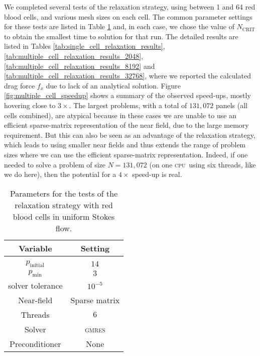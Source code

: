 \documentclass[smallcondensed,final]{svjour3}
\newcommand{\cpu}{\textsc{cpu}}
\newcommand{\ncrit}{N_{\text{CRIT}}}
\newcommand{\gmres}{\textsc{gmres}\xspace}
\begin{document}
We completed several tests of the relaxation strategy, using between 1 and 64 red blood cells, and various mesh sizes on each cell. The common parameter settings for these tests are listed in Table \ref{tab:cells_relaxation_settings} and, in each case, we chose the value of $\ncrit$ to obtain the smallest time to solution for that run. The detailed results are listed in Tables \ref{tab:single_cell_relaxation_results}, \ref{tab:multiple_cell_relaxation_results_2048}, \ref{tab:multiple_cell_relaxation_results_8192} and \ref{tab:multiple_cell_relaxation_results_32768}, where we reported the calculated drag force $f_x$ due to lack of an analytical solution. Figure \ref{fig:multiple_cell_speedup} shows a summary of the observed speed-ups, mostly hovering close to $3\times$. The largest problems, with a total of $131,072$ panels (all cells combined), are atypical because in these cases we are unable to use an efficient sparse-matrix representation of the near field, due to the large memory requirement. But this can also be seen as an advantage of the relaxation strategy, which leads to using smaller near fields and thus extends the range of problem sizes where we can use the efficient sparse-matrix representation. Indeed, if one needed to solve a problem of size $N=131,072$ (on one \cpu\ using six threads, like we do here), then the potential for a $4\times$ speed-up is real.

\begin{table}[h]
\footnotesize
\begin{center}
\begin{tabular}{c|c}
 Variable & Setting \\ 
\hline
 & \\
 $p_{\text{initial}}$ & $14$ \\
 $p_{\text{min}}$ &  $3$ \\
 solver tolerance & $10^{-5}$ \\
 Near-field & Sparse matrix \\
 Threads & $6$ \\
 Solver & {\gmres} \\ 
 Preconditioner & None
\end{tabular}
\end{center}
\caption{Parameters for the tests of the relaxation strategy with red blood cells in uniform Stokes flow.}
\label{tab:cells_relaxation_settings}
\end{table}%
\end{document}
